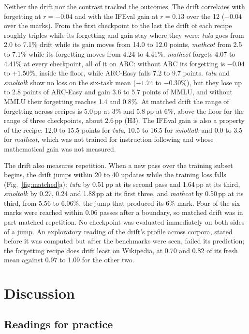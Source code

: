 \documentclass[11pt,a4paper]{article}
\theoremstyle{definition}
\newcommand{\tulu}{\textit{tulu}}
\newcommand{\smoltalk}{\textit{smoltalk}}
\newcommand{\mathcot}{\textit{mathcot}}
\newcommand{\pp}{\,pp}
\begin{document}
Neither the drift nor the contrast tracked the outcomes. The drift correlates with forgetting at $r=-0.04$ and
with the IFEval gain at $r=0.13$ over the 12 ($-0.04$ over the marks). From the first checkpoint to the last the
drift of each recipe roughly triples while its forgetting and gain stay where they were: \tulu{} goes from 2.0 to 7.1\%
drift while its gain moves from 14.0 to 12.0 points, \mathcot{} from 2.5 to 7.1\% while its forgetting moves from
4.24 to 4.41\%. \mathcot{} forgets 4.07 to 4.41\% at every checkpoint, all of it on ARC: without ARC its forgetting
is $-0.04$ to $+1.50\%$, inside the floor, while ARC-Easy falls 7.2 to 9.7 points. \tulu{} and \smoltalk{} show no
loss on the six-task mean ($-1.74$ to $-0.30\%$), but they lose up to 2.8 points of ARC-Easy and gain 3.6 to 5.7
points of MMLU, and without MMLU their forgetting reaches 1.4 and 0.8\%. At matched drift the range of forgetting
across recipes is 5.0\pp{} at 3\% and 5.8\pp{} at 6\%, above the floor for the range of three checkpoints, about
2.6\pp{} (H3). The IFEval gain is also a property of the recipe: 12.0 to 15.5 points for \tulu{}, 10.5 to 16.5 for
\smoltalk{} and 0.0 to 3.5 for \mathcot{}, which was not trained for instruction following and whose mathematical
gain was not measured.

The drift also measures repetition. When a new pass over the training subset begins, the drift jumps within 20 to
40 updates while the training loss falls (Fig.~\ref{fig:matched}a): \tulu{} by 0.51\pp{} at its second pass and
1.64\pp{} at its third, \smoltalk{} by 0.27, 0.24 and 1.88\pp{} at its first three, and \mathcot{} by 0.50\pp{} at its
third, from 5.56 to 6.06\%, the jump that produced its 6\% mark. Four of the six marks were reached within 0.06
passes after a boundary, so matched drift was in part matched repetition. No checkpoint was evaluated immediately
on both sides of a jump. An exploratory reading of the drift's profile across corpora, stated before it was
computed but after the benchmarks were seen, failed its prediction; the forgetting recipe does drift least on
Wikipedia, at 0.70 and 0.82 of its fresh mean against 0.97 to 1.09 for the other two.

\section{Discussion}
\label{sec:discussion}

\subsection{Readings for practice}
\end{document}
